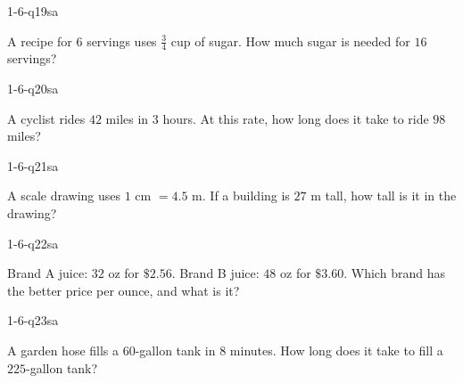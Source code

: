\begin{practiceQuestion}{1-6-q19}{sa}
\begin{questionText}
A recipe for $6$ servings uses $\frac{3}{4}$ cup of sugar. How much sugar is needed for $16$ servings?
\end{questionText}
\end{practiceQuestion}

\begin{practiceQuestion}{1-6-q20}{sa}
\begin{questionText}
A cyclist rides $42$ miles in $3$ hours. At this rate, how long does it take to ride $98$ miles?
\end{questionText}
\end{practiceQuestion}

\begin{practiceQuestion}{1-6-q21}{sa}
\begin{questionText}
A scale drawing uses $1$ cm $= 4.5$ m. If a building is $27$ m tall, how tall is it in the drawing?
\end{questionText}
\end{practiceQuestion}

\begin{practiceQuestion}{1-6-q22}{sa}
\begin{questionText}
Brand A juice: $32$ oz for $\$2.56$. Brand B juice: $48$ oz for $\$3.60$. Which brand has the better price per ounce, and what is it?
\end{questionText}
\end{practiceQuestion}

\begin{practiceQuestion}{1-6-q23}{sa}
\begin{questionText}
A garden hose fills a $60$-gallon tank in $8$ minutes. How long does it take to fill a $225$-gallon tank?
\end{questionText}
\end{practiceQuestion}

